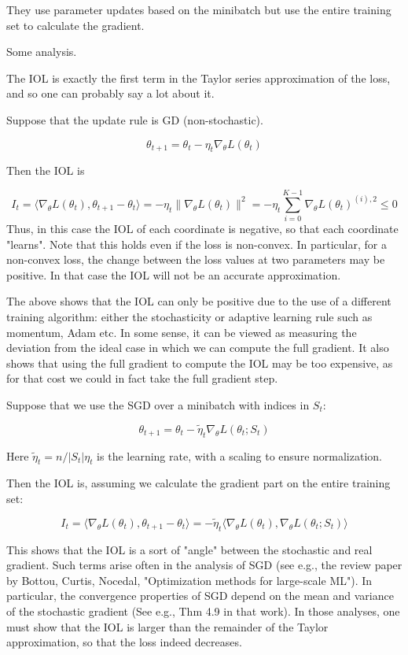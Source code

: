\documentclass[english]{article}
\begin{document}
They use parameter updates based on the minibatch but use the entire training set to
calculate the gradient.


Some analysis.

The IOL is exactly the first term in the Taylor series approximation of the loss, and so one can probably say a lot about it. 

Suppose that the update rule is GD (non-stochastic). 

$$\theta_{t+1} = \theta_{t} - \eta_t \nabla_\theta L(\theta_{t})$$

Then the IOL is 

$$I_t = 
\langle\nabla_\theta L(\theta_{t} ), \theta_{t+1} - \theta_{t} 
\rangle
=
- \eta_t 
\|\nabla_\theta L(\theta_{t} )\|^2
=
- \eta_t\sum_{i=0}^{K-1}
\nabla_\theta L(\theta_{t} )^{(i),2}\le 0
$$
Thus, in this case the IOL of each coordinate is negative, so that each coordinate "learns". Note that this holds even if the loss is non-convex. In particular, for a non-convex loss, the change between the loss values at two parameters may be positive. In that case the IOL will not be an accurate approximation.

The above shows that the IOL can only be positive due to the use of a different training algorithm: either the stochasticity or adaptive learning rule such as momentum, Adam etc. In some sense, it can be viewed as measuring the deviation from the ideal case in which we can compute the full gradient. It also shows that using the full gradient to compute the IOL may be too expensive, as for that cost we could in fact take the full gradient step. 


Suppose that we use the SGD over a minibatch with indices in $S_t$: 

$$\theta_{t+1} = \theta_{t} - \tilde\eta_t \nabla_\theta L(\theta_{t};S_t)$$

Here $\tilde\eta_t = n/|S_t|\eta_t$ is the learning rate, with a scaling to ensure normalization. 

Then the IOL is, assuming we calculate the gradient part on the entire training set: 

$$I_t = 
\langle\nabla_\theta L(\theta_{t} ), \theta_{t+1} - \theta_{t} 
\rangle
=
- \tilde\eta_t 
\langle\nabla_\theta L(\theta_{t} ), \nabla_\theta L(\theta_{t};S_t)
\rangle 
$$

This shows that the IOL is a sort of "angle" between the stochastic and real gradient. Such terms arise often in the analysis of SGD (see e.g., the review paper by Bottou, Curtis, Nocedal, "Optimization methods for large-scale ML"). In particular, the convergence properties of SGD depend on the mean and variance of the stochastic gradient (See e.g., Thm 4.9 in that work). In those analyses, one must show that the IOL is larger than the remainder of the Taylor approximation, so that the loss indeed decreases. 
\end{document}
